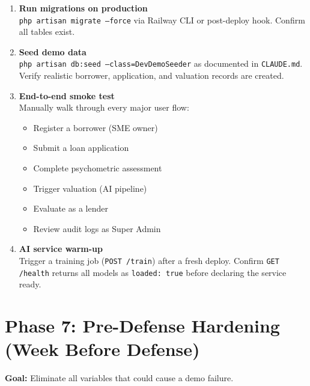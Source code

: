 \documentclass[12pt,a4paper]{report}
\begin{document}
\begin{enumerate}[leftmargin=1.5em, label=\textbf{\arabic*.}, start=23]

    \item \textbf{Run migrations on production} \\
    \texttt{php artisan migrate --force} via Railway CLI or
    post-deploy hook. Confirm all tables exist.

    \item \textbf{Seed demo data} \\
    \texttt{php artisan db:seed --class=DevDemoSeeder} as documented
    in \texttt{CLAUDE.md}. Verify realistic borrower, application,
    and valuation records are created.

    \item \textbf{End-to-end smoke test} \\
    Manually walk through every major user flow:
    \begin{itemize}[leftmargin=1em]
        \item Register a borrower (SME owner)
        \item Submit a loan application
        \item Complete psychometric assessment
        \item Trigger valuation (AI pipeline)
        \item Evaluate as a lender
        \item Review audit logs as Super Admin
    \end{itemize}

    \item \textbf{AI service warm-up} \\
    Trigger a training job (\texttt{POST /train}) after a fresh
    deploy. Confirm \texttt{GET /health} returns all models as
    \texttt{loaded: true} before declaring the service ready.

\end{enumerate}

\section{Phase 7: Pre-Defense Hardening (Week Before Defense)}

\textbf{Goal:} Eliminate all variables that could cause a demo failure.
\end{document}

